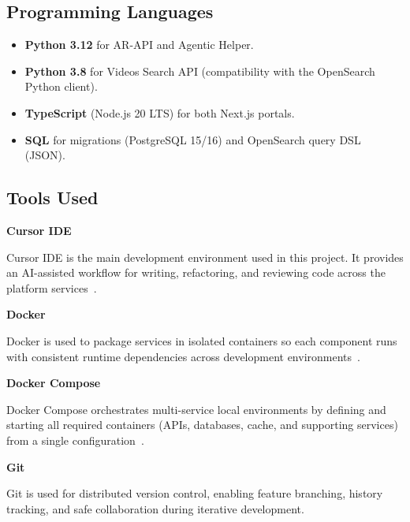 
\subsection{Programming Languages}

\begin{itemize}
  \item \textbf{Python 3.12} for AR-API and Agentic Helper.
  \item \textbf{Python 3.8} for Videos Search API (compatibility with the OpenSearch Python client).
  \item \textbf{TypeScript} (Node.js 20 LTS) for both Next.js portals.
  \item \textbf{SQL} for migrations (PostgreSQL 15/16) and OpenSearch query DSL (JSON).
\end{itemize}

\subsection{Tools Used}

\textbf{Cursor IDE}

Cursor IDE is the main development environment used in this project. It provides an AI-assisted
workflow for writing, refactoring, and reviewing code across the platform services~.


\textbf{Docker}

Docker is used to package services in isolated containers so each component runs with consistent
runtime dependencies across development environments~.


\textbf{Docker Compose}

Docker Compose orchestrates multi-service local environments by defining and starting all required
containers (APIs, databases, cache, and supporting services) from a single configuration~.


\textbf{Git}

Git is used for distributed version control, enabling feature branching, history tracking, and safe
collaboration during iterative development.

